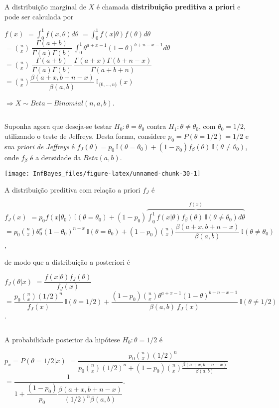 \documentclass[
]{book}
\begin{document}
A distribuição marginal de \(X\) é chamada \textbf{distribuição preditiva a priori} e pode ser calculada por

\(f(x)\) \(=\displaystyle \int_0^1 f(x,\theta)d\theta\)
\(=\displaystyle \int_0^1 f(x|\theta)f(\theta)d\theta\)
\(=\displaystyle \binom{n}{x}~\dfrac{\Gamma(a+b)}{\Gamma(a)\Gamma(b)}~\int_0^1 \theta^{a+x-1}(1-\theta)^{b+n-x-1}d\theta\)
\(=\displaystyle \binom{n}{x}~\dfrac{\Gamma(a+b)}{\Gamma(a)\Gamma(b)}~\dfrac{\Gamma(a+x)\Gamma(b+n-x)}{\Gamma(a+b+n)}\)
\(=\displaystyle \binom{n}{x} \dfrac{\beta(a+x,b+n-x)}{\beta(a,b)}~\mathbb{I}_{\{0,\ldots,n\}}(x)\)

\(\Longrightarrow X \sim Beta-Binomial(n,a,b)\).

\(~\)

Suponha agora que deseja-se testar \(H_0: \theta=\theta_0\) contra \(H_1:\theta\neq \theta_0\), com \(\theta_0=1/2\), utilizando o teste de Jeffreys. Desta forma, considere \(p_0=P(\theta=1/2)=1/2\) e sua \emph{priori de Jeffreys} é \(f_J(\theta)=p_0~\mathbb{I}(\theta=\theta_0) +(1-p_0)f_\beta(\theta)~\mathbb{I}(\theta\neq\theta_0)\), onde \(f_\beta\) é a densidade da \(Beta(a,b)\).

\begin{center}\texttt{[image: InfBayes\_files/figure-latex/unnamed-chunk-30-1]} \end{center}

A distribuição preditiva com relação a priori \(f_J\) é

\(f_J(x)\) \(=\displaystyle p_0f(x|\theta_0)~\mathbb{I}(\theta=\theta_0)+ (1-p_0)\overbrace{\int_0^1f(x|\theta)f_\beta(\theta)~\mathbb{I}(\theta\neq\theta_0)d\theta}^{f(x)}\)
\(=\displaystyle p_0\binom{n}{x}{\theta}_0^x(1-\theta_0)^{n-x}~\mathbb{I}(\theta=\theta_0) + (1-p_0)\binom{n}{x}\dfrac{\beta(a+x,b+n-x)}{\beta(a,b)}~\mathbb{I}(\theta\neq\theta_0)\),

de modo que a distribuição a posteriori é

\(f_J(\theta| x)\) \(= \dfrac{f( x|\theta)f_J(\theta)}{f_J(x)}\)
\(= \dfrac{p_0\binom{n}{x} (1/2)^n}{f_J(x)}~\mathbb{I}(\theta=1/2) +\dfrac{(1-p_0)\binom{n}{x}\theta^{a+x-1}(1-\theta)^{b+n-x-1}}{\beta(a,b)~f_J(x)}~\mathbb I(\theta\neq 1/2)\).

\(~\)

A probabilidade posterior da hipótese \(H_0:\theta=1/2\) é

\(p_x=P(\theta=1/2|x)\) \(=\dfrac{p_0\binom{n}{x}(1/2)^n}{p_0\binom{n}{x}(1/2)^n+(1-p_0)\binom{n}{x}\frac{\beta(a+x,b+n-x)}{\beta(a,b)}}\) \(=\dfrac{1}{1+\dfrac{(1-p_0)}{p_0}\dfrac{\beta(a+x,b+n-x)}{(1/2)^n\beta(a,b)}}\).
\end{document}

